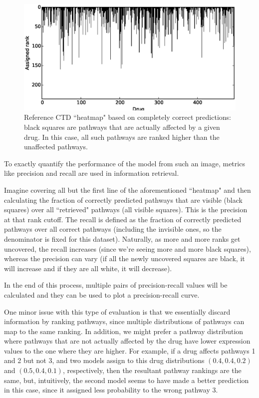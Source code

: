 \documentclass[12pt,a4paper,twoside,openright]{report}
\begin{document}
\begin{figure}[!htb]
\includegraphics[width=\textwidth]{ref-ctd-heatmap.eps}
\caption{Reference CTD ``heatmap" based on completely correct predictions: black squares are pathways that are actually affected by a given drug. In this case, all such pathways are ranked higher than the unaffected pathways.}
\label{fig:ref-ctd-heatmap}
\end{figure}

To exactly quantify the performance of the model from such an image, metrics like precision and recall are used in information retrieval. 

Imagine covering all but the first line of the aforementioned ``heatmap" and then calculating the fraction of correctly predicted pathways that are visible (black squares) over all ``retrieved" pathways (all visible squares). This is the precision at that rank cutoff. The recall is defined as the fraction of correctly predicted pathways over all correct pathways (including the invisible ones, so the denominator is fixed for this dataset). Naturally, as more and more ranks get uncovered, the recall increases (since we're seeing more and more black squares), whereas the precision can vary (if all the newly uncovered squares are black, it will increase and if they are all white, it will decrease).

In the end of this process, multiple pairs of precision-recall values will be calculated and they can be used to plot a precision-recall curve.

One minor issue with this type of evaluation is that we essentially discard information by ranking pathways, since multiple distributions of pathways can map to the same ranking. In addition, we might prefer a pathway distribution where pathways that are not actually affected by the drug have lower expression values to the one where they are higher. For example, if a drug affects pathways 1 and 2 but not 3, and two models assign to this drug distributions $(0.4, 0.4, 0.2)$ and $(0.5, 0.4, 0.1)$, respectively, then the resultant pathway rankings are the same, but, intuitively, the second model seems to have made a better prediction in this case, since it assigned less probability to the wrong pathway 3.
\end{document}
